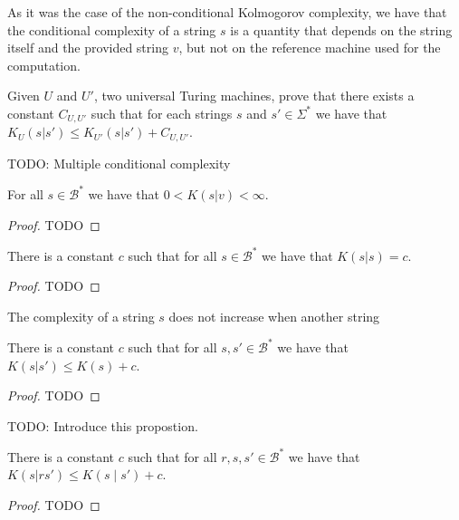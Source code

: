 As it was the case of the non-conditional Kolmogorov complexity, we have that the conditional complexity of a string $s$ is a quantity that depends on the string itself and the provided string $v$, but not on the reference machine used for the computation.

\begin{exercise}
Given $U$ and $U'$, two universal Turing machines, prove that there exists a constant $C_{U, U'}$ such that for each strings $s$ and $s' \in \Sigma^{\ast}$ we have that $K_{U}(s|s') \leq K_{U'}(s|s') + C_{U, U'}$.
\end{exercise}

{\color{red} TODO: Multiple conditional complexity}

\begin{proposition}
For all $s\in\mathcal{B}^{\ast}$ we have that $0 < K(s | v) < \infty$.
\end{proposition}
\begin{proof}
{\color{red} TODO}
\end{proof}


\begin{proposition}
There is a constant $c$ such that for all $s\in\mathcal{B}^{\ast}$ we have that $K(s | s ) = c$.
\end{proposition}
\label{prop:self_conditional}
\begin{proof}
{\color{red} TODO}
\end{proof}

The complexity of a string $s$ does not increase when another string

\begin{proposition}
\label{prop:kolmogorov_conditional}
There is a constant $c$ such that for all $s, s'\in\mathcal{B}^{\ast}$ we have that $K(s | s' ) \leq K(s) + c$.
\end{proposition}
\begin{proof}
{\color{red} TODO}
\end{proof}

{\color{red} TODO: Introduce this propostion.}

\begin{proposition}
\label{prop:kolmogorov_joint_conditional}
There is a constant $c$ such that for all $r ,s, s'\in\mathcal{B}^{\ast}$ we have that $K(s | rs' ) \leq K(s \mid s') + c$.
\end{proposition}
\begin{proof}
{\color{red} TODO}
\end{proof}


